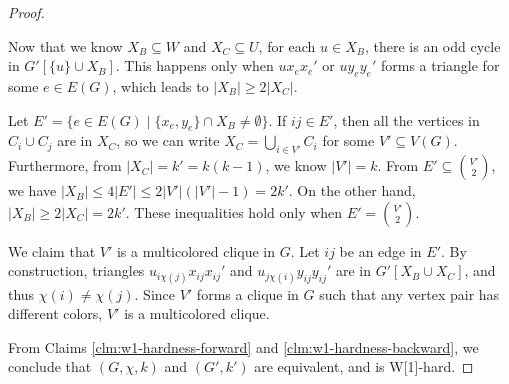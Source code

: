 \begin{proof}
\begin{claimproof}
    Now that we know $X_B \subseteq W$ and $X_C \subseteq U$,
    for each $u \in X_B$, there is an odd cycle in $G'[\{u\} \cup X_B]$.
    This happens only when $u x_e x_e'$ or $u y_e y_e'$ forms a triangle for some $e \in E(G)$,
    which leads to $|X_B| \geq 2|X_C|$.

    Let $E' = \{e \in E(G) \mid \{x_e, y_e\} \cap X_B \neq \emptyset\}$.
    If $ij \in E'$, then all the vertices in $C_i \cup C_j$ are in $X_C$,
    so we can write $X_C=\bigcup_{i \in V'}C_i$ for some $V' \subseteq V(G)$.
    Furthermore, from $|X_C|=k'=k(k-1)$, we know $|V'|=k$.
    From $E' \subseteq \binom{V'}{2}$, we have $|X_B| \leq 4|E'| \leq 2|V'|(|V'|-1)=2k'$.
    On the other hand, $|X_B| \geq 2|X_C| = 2k'$.
    These inequalities hold only when $E'=\binom{V'}{2}$.

    We claim that $V'$ is a multicolored clique in $G$.
    Let $ij$ be an edge in $E'$.
    By construction, triangles $u_{i \chi(j)}x_{ij}x_{ij}'$ and $u_{j \chi(i)}y_{ij}y_{ij}'$
    are in $G'[X_B \cup X_C]$, and thus $\chi(i)\neq \chi(j)$.
    Since $V'$ forms a clique in $G$ such that any vertex pair has different colors,
    $V'$ is a multicolored clique.
  \end{claimproof}

  From Claims \ref{clm:w1-hardness-forward} and \ref{clm:w1-hardness-backward},
  we conclude that $(G,\chi,k)$ and $(G',k')$ are equivalent,
  and  is W[1]-hard.
\end{proof}



